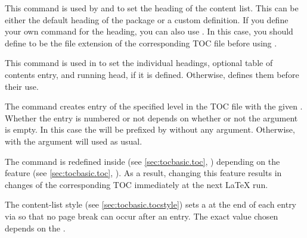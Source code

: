\begin{Declaration}
\end{Declaration}
This command is used by  and
 to set the heading of the content list.
This can be either the default heading of the  package or a
custom definition. If you define your own command for the heading, you can
also use . In this case, you should define
 to be the file
extension of the corresponding TOC file before using
.%
\EndIndexGroup


\begin{Declaration}
\end{Declaration}
This command is used in  to set the
individual headings, optional table of contents entry, and running head, if it
is defined. Otherwise,  defines them
before their use.%
\EndIndexGroup


\begin{Declaration}
\end{Declaration}
The 
command creates entry of the specified level in the TOC file with the given
. Whether the entry is numbered or not depends on whether or
not the  argument is empty. In this case the  will
be prefixed by  without any argument. Otherwise,
 with the  argument will used
as usual.

The  command is redefined inside
 (see \autoref{sec:tocbasic.toc},
) depending on the 
feature (see \autoref{sec:tocbasic.toc},
). As a result, changing this feature
results in changes of the corresponding TOC immediately at the next \LaTeX{}
run.%
\EndIndexGroup


\begin{Declaration}
\end{Declaration}
The 
content-list style (see \autoref{sec:tocbasic.tocstyle}) sets a
 at the end of each entry via
 so that no page break can occur after an
entry. The exact value chosen depends on the .

